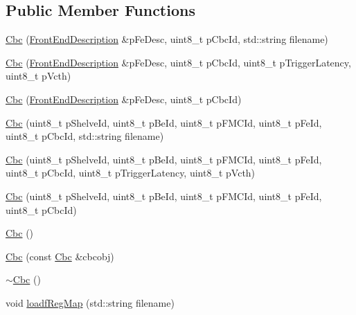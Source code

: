 \subsection*{Public Member Functions}
\begin{DoxyCompactItemize}
\item 
\hyperlink{class_ph2___hw_description_1_1_cbc_a88c9c022e04628b60495b94df2ab0825}{Cbc} (\hyperlink{class_ph2___hw_description_1_1_front_end_description}{Front\-End\-Description} \&p\-Fe\-Desc, uint8\-\_\-t p\-Cbc\-Id, std\-::string filename)
\item 
\hyperlink{class_ph2___hw_description_1_1_cbc_a929b933c8e68c922fc0f7e45d6deb32d}{Cbc} (\hyperlink{class_ph2___hw_description_1_1_front_end_description}{Front\-End\-Description} \&p\-Fe\-Desc, uint8\-\_\-t p\-Cbc\-Id, uint8\-\_\-t p\-Trigger\-Latency, uint8\-\_\-t p\-Vcth)
\item 
\hyperlink{class_ph2___hw_description_1_1_cbc_ae5f520d7733b7b92bc19805e39d5da66}{Cbc} (\hyperlink{class_ph2___hw_description_1_1_front_end_description}{Front\-End\-Description} \&p\-Fe\-Desc, uint8\-\_\-t p\-Cbc\-Id)
\item 
\hyperlink{class_ph2___hw_description_1_1_cbc_ad2ec420b5bd8e361a151b585a62c0ebe}{Cbc} (uint8\-\_\-t p\-Shelve\-Id, uint8\-\_\-t p\-Be\-Id, uint8\-\_\-t p\-F\-M\-C\-Id, uint8\-\_\-t p\-Fe\-Id, uint8\-\_\-t p\-Cbc\-Id, std\-::string filename)
\item 
\hyperlink{class_ph2___hw_description_1_1_cbc_a31698ad31b2484c74b87647e9451fc6d}{Cbc} (uint8\-\_\-t p\-Shelve\-Id, uint8\-\_\-t p\-Be\-Id, uint8\-\_\-t p\-F\-M\-C\-Id, uint8\-\_\-t p\-Fe\-Id, uint8\-\_\-t p\-Cbc\-Id, uint8\-\_\-t p\-Trigger\-Latency, uint8\-\_\-t p\-Vcth)
\item 
\hyperlink{class_ph2___hw_description_1_1_cbc_ac7e237f12e6950b45538e3706be11bb0}{Cbc} (uint8\-\_\-t p\-Shelve\-Id, uint8\-\_\-t p\-Be\-Id, uint8\-\_\-t p\-F\-M\-C\-Id, uint8\-\_\-t p\-Fe\-Id, uint8\-\_\-t p\-Cbc\-Id)
\item 
\hyperlink{class_ph2___hw_description_1_1_cbc_a5b7124456823871d611ada17ed0a51a1}{Cbc} ()
\item 
\hyperlink{class_ph2___hw_description_1_1_cbc_ab529cbb8cbbbc3b28a7ca2a472d4aa50}{Cbc} (const \hyperlink{class_ph2___hw_description_1_1_cbc}{Cbc} \&cbcobj)
\item 
\hyperlink{class_ph2___hw_description_1_1_cbc_a4e641d292073978e6e1b34fa91c13067}{$\sim$\-Cbc} ()
\item 
void \hyperlink{class_ph2___hw_description_1_1_cbc_afd6fdbe40eff3c160221a3a8acfb657d}{loadf\-Reg\-Map} (std\-::string filename)

\end{DoxyCompactItemize}
